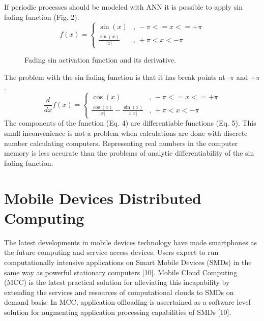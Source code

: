 \documentclass{llncs}
\begin{document}
If periodic processes should be modeled with ANN it is possible to apply sin fading function (Fig. 2).
%
\begin{equation}
f(x) = 
\left\{
	\begin{array}{ll}
		\sin(x) & \mbox{, } -\pi <= x <= +\pi \\
		\frac {\sin(x)} { |x| } & \mbox{, } +\pi < x < -\pi
	\end{array}
\right.
\end{equation}
%
\begin{figure}
    \centering
    \caption{Fading sin activation function and its derivative.}
    \label{fig:fig02}
\end{figure}
%
The problem with the sin fading function is that it has break points at -$\pi$ and +$\pi$.
%
\begin{equation}
\frac{d}{dx}f(x) = 
\left\{
	\begin{array}{ll}
		\cos(x) & \mbox{, } -\pi <= x <= +\pi \\
		\frac {\cos(x)} { |x| } - \frac{ \sin(x) }{ x |x| } & \mbox{, } +\pi < x < -\pi
	\end{array}
\right.
\end{equation}
%
The components of the function (Eq. 4) are differentiable functions (Eq. 5). This small inconvenience is not a problem when calculations are done with discrete number calculating computers. Representing real numbers in the computer memory is less accurate than the problems of analytic differentiability of the sin fading function. 
%
\section{Mobile Devices Distributed Computing}
%
The latest developments in mobile devices technology have made smartphones as the future computing and service access devices. Users expect to run computationally intensive applications on Smart Mobile Devices (SMDs) in the same way as powerful stationary computers [10]. Mobile Cloud Computing (MCC) is the latest practical solution for alleviating this incapability by extending the services and resources of computational clouds to SMDs on demand basis. In MCC, application offloading is ascertained as a software level solution for augmenting application processing capabilities of SMDs [10]. 
\end{document}
